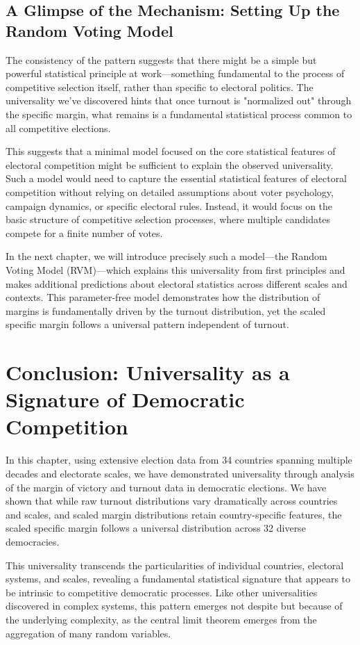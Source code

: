 \subsection{A Glimpse of the Mechanism: Setting Up the Random Voting Model}

The consistency of the pattern suggests that there might be a simple but powerful statistical principle at work—something fundamental to the process of competitive selection itself, rather than specific to electoral politics. The universality we've discovered hints that once turnout is "normalized out" through the specific margin, what remains is a fundamental statistical process common to all competitive elections. 

This suggests that a minimal model focused on the core statistical features of electoral competition might be sufficient to explain the observed universality. Such a model would need to capture the essential statistical features of electoral competition without relying on detailed assumptions about voter psychology, campaign dynamics, or specific electoral rules. Instead, it would focus on the basic structure of competitive selection processes, where multiple candidates compete for a finite number of votes.

In the next chapter, we will introduce precisely such a model—the Random Voting Model (RVM)—which explains this universality from first principles and makes additional predictions about electoral statistics across different scales and contexts. This parameter-free model demonstrates how the distribution of margins is fundamentally driven by the turnout distribution, yet the scaled specific margin follows a universal pattern independent of turnout.

\section{Conclusion: Universality as a Signature of Democratic Competition}

In this chapter, using extensive election data from 34 countries spanning multiple decades and electorate scales, we have demonstrated universality through analysis of the margin of victory and turnout data in democratic elections. We have shown that while raw turnout distributions vary dramatically across countries and scales, and scaled margin distributions retain country-specific features, the scaled specific margin follows a universal distribution across 32 diverse democracies.

This universality transcends the particularities of individual countries, electoral systems, and scales, revealing a fundamental statistical signature that appears to be intrinsic to competitive democratic processes. Like other universalities discovered in complex systems, this pattern emerges not despite but because of the underlying complexity, as the central limit theorem emerges from the aggregation of many random variables.


